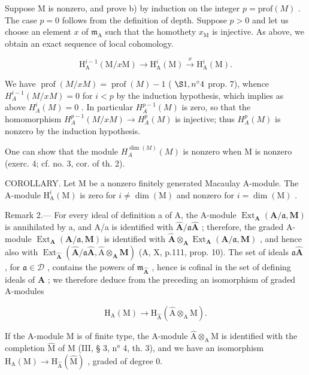 Suppose M is nonzero, and prove b) by induction on the integer \(p = \text{prof}(M)\) . The case \(p = 0\) follows from the definition of depth. Suppose \(p > 0\) and let us choose an element \(x\) of \(\mathfrak{m}_{\mathrm{A}}\) such that the homothety \(x_{\mathrm{M}}\) is injective. As above, we obtain an exact sequence of local cohomology.

\[
\mathrm{H} _ {\mathrm{A}} ^ {i - 1} (\mathrm{M} / x \mathrm{M}) \longrightarrow \mathrm{H} _ {\mathrm{A}} ^ {i} (\mathrm{M}) \xrightarrow {x} \mathrm{H} _ {\mathrm{A}} ^ {i} (\mathrm{M}).
\]

We have \(\operatorname{prof}(M/xM) = \operatorname{prof}(M) - 1\) ( \(\S 1, n^{\circ} 4\) prop. 7), whence \(H_{A}^{i-1}(M/xM) = 0\) for \(i < p\) by the induction hypothesis, which implies as above \(H_{A}^{i}(M) = 0\) . In particular \(H_{A}^{p-1}(M)\) is zero, so that the homomorphism \(H_{A}^{p-1}(M/xM) \longrightarrow H_{A}^{p}(M)\) is injective; thus \(H_{A}^{p}(M)\) is nonzero by the induction hypothesis.

One can show that the module \(H_{A}^{\dim(M)}(M)\) is nonzero when M is nonzero (exerc. 4; cf. no. 3, cor. of th. 2).

COROLLARY. Let M be a nonzero finitely generated Macaulay A-module. The A-module \(\mathrm{H}_{\mathrm{A}}^{i}(\mathrm{M})\) is zero for \(i \neq \dim(\mathrm{M})\) and nonzero for \(i = \dim(\mathrm{M})\) .

Remark 2.--- For every ideal of definition a of A, the A-module \(\operatorname{Ext}_{\mathbf{A}}(\mathbf{A}/\mathfrak{a},\mathbf{M})\) is annihilated by a, and A/a is identified with \(\widehat{\mathbf{A}}/\mathfrak{a}\widehat{\mathbf{A}}\) ; therefore, the graded A-module \(\operatorname{Ext}_{\mathbf{A}}(\mathbf{A}/\mathfrak{a},\mathbf{M})\) is identified with \(\widehat{\mathbf{A}}\otimes_{\mathbf{A}}\operatorname{Ext}_{\mathbf{A}}(\mathbf{A}/\mathfrak{a},\mathbf{M})\) , and hence also with \(\operatorname{Ext}_{\widehat{\mathbf{A}}}(\widehat{\mathbf{A}}/\mathfrak{a}\widehat{\mathbf{A}},\widehat{\mathrm{A}}\otimes_{\mathbf{A}}\mathbf{M})\) (A, X, p.111, prop. 10). The set of ideals \(\mathfrak{a}\widehat{\mathbf{A}}\) , for \(\mathfrak{a}\in\mathcal{D}\) , contains the powers of \(\mathfrak{m}_{\widehat{\mathbf{A}}}\) , hence is cofinal in the set of defining ideals of \(\widehat{\mathbf{A}}\) ; we therefore deduce from the preceding an isomorphism of graded A-modules

\[
\mathrm{H} _ {\mathrm{A}} (\mathrm{M}) \longrightarrow \mathrm{H} _ {\widehat {\mathrm{A}}} (\widehat {\mathrm{A}} \otimes_ {\mathrm{A}} \mathrm{M}).
\]

If the A-module M is of finite type, the A-module \(\widehat{\mathrm{A}}\otimes_{\mathrm{A}}\mathrm{M}\) is identified with the completion \(\widehat{\mathrm{M}}\) of M (III, § 3, n° 4, th. 3), and we have an isomorphism \(\mathrm{H}_{\mathrm{A}}(\mathrm{M})\to \mathrm{H}_{\widehat{\mathrm{A}}}(\widehat{\mathrm{M}})\) , graded of degree 0.

